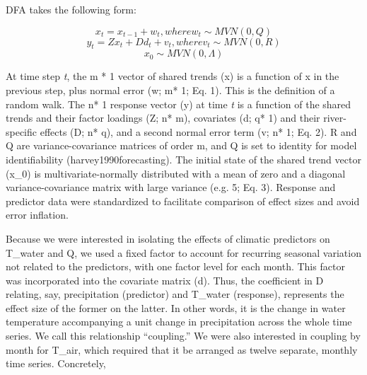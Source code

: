 DFA takes the following form:

\begin{equation}
    x_t = x_{t-1} + w_t, where  w_t \sim MVN(0,Q)
\end{equation}
\begin{equation}
    y_t = Zx_t + Dd_t + v_t, where  v_t \sim MVN(0,R)
\end{equation}
\begin{equation}
    x_0 \sim MVN(0,\Lambda)
\end{equation}

At time step {\it t}, the m * 1 vector of shared trends (x) is a function of x in the previous step, plus normal error (w; m* 1; Eq. 1). This is the definition of a random walk. The n* 1 response vector (y) at time {\it t} is a function of the shared trends and their factor loadings (Z; n* m), covariates (d; q* 1) and their river-specific effects (D; n* q), and a second normal error term (v; n* 1; Eq. 2). R and Q are variance-covariance matrices of order m, and Q is set to identity for model identifiability (harvey1990forecasting). The initial state of the shared trend vector (x_0) is multivariate-normally distributed with a mean of zero and a diagonal variance-covariance matrix with large variance (e.g. 5; Eq. 3). Response and predictor data were standardized to facilitate comparison of effect sizes and avoid error inflation.

Because we were interested in isolating the effects of climatic predictors on T_water and Q, we used a fixed factor to account for recurring seasonal variation not related to the predictors, with one factor level for each month. This factor was incorporated into the covariate matrix (d). Thus, the coefficient in D relating, say, precipitation (predictor) and T_water (response), represents the effect size of the former on the latter. In other words, it is the change in water temperature accompanying a unit change in precipitation across the whole time series. We call this relationship ``coupling.'' We were also interested in coupling by month for T_air, which required that it be arranged as twelve separate, monthly time series. Concretely,


